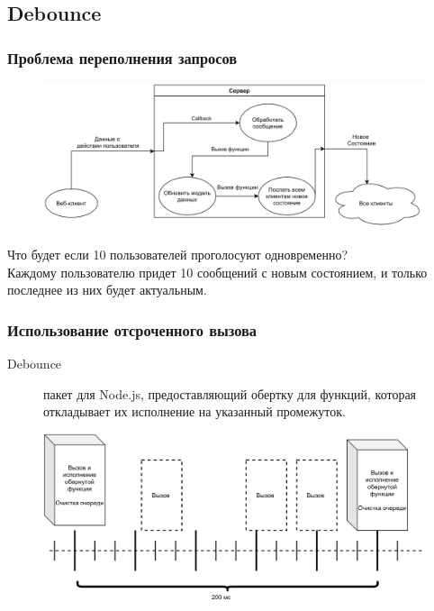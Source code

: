 \documentclass{beamer}
\begin{document}
\subsection{Debounce}
\begin{frame}
\frametitle{Проблема переполнения запросов}
\begin{figure}
	\includegraphics[width=\linewidth]{img/nodeb.png}
\end{figure}
	Что будет если 10 пользователей проголосуют одновременно?\\
	Каждому пользователю придет 10 сообщений с новым состоянием, и только последнее из них будет актуальным.  
\end{frame}

\begin{frame}
\frametitle{Использование отсроченного вызова}
\begin{description}
	\item[Debounce] пакет для Node.js, предоставляющий обертку для функций, которая откладывает их исполнение на указанный промежуток.
\end{description} 
	 \begin{figure}
	 	\includegraphics[width=\linewidth]{img/debounce.png}
	 \end{figure}
\end{frame}
\end{document}
